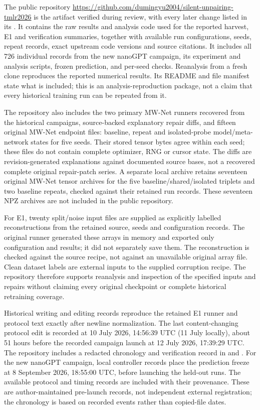 The public repository
\url{https://github.com/dumingyu2004/silent-unpairing-tmlr2026} is the artifact
verified during review, with every later change listed in its
. It contains the raw results and analysis code
used for the reported harvest, E1 and verification summaries, together with
available run configurations, seeds, repeat records, exact upstream code
versions and source citations. It includes all 726 individual records from
the new nanoGPT campaign, its experiment and analysis scripts, frozen
prediction, and per-seed checks. Reanalysis from a fresh clone
reproduces the reported numerical results. Its README and file manifest
state what is included; this is an analysis-reproduction package, not a
claim that every historical training run can be repeated from it.

The repository also includes the two primary MW-Net runners recovered from
the historical campaigns, source-backed explanatory repair diffs, and fifteen original
MW-Net endpoint files: baseline, repeat and isolated-probe model/meta-network
states for five seeds. Their stored tensor bytes agree within each seed;
these files do not contain complete optimizer, RNG or cursor state.
The diffs are revision-generated explanations against documented source
bases, not a recovered complete original repair-patch series.
A separate local archive retains seventeen original MW-Net tensor
archives for the five baseline/shared/isolated triplets and two baseline
repeats, checked against their retained run records. These seventeen NPZ
archives are not included in the public repository.

For E1, twenty split/noise input files are supplied as explicitly labelled
reconstructions from the retained source, seeds and configuration records.
The original runner generated these arrays in memory and exported only
configuration and results; it did not separately save them. The reconstruction
is checked against the source recipe, not against an unavailable original
array file. Clean dataset labels are external inputs to the supplied corruption
recipe. The repository therefore supports reanalysis and inspection of the
specified inputs and repairs without claiming every original checkpoint or
complete historical retraining coverage.

Historical writing and editing records reproduce the retained E1 runner and
protocol text exactly after newline normalization. The last content-changing
protocol edit is recorded at 10 July 2026, 14:56:39 UTC (11 July locally),
about 51 hours before the recorded campaign launch at 12 July 2026,
17:39:29 UTC. The repository includes a redacted chronology and verification
record in  and
.
For the new nanoGPT campaign, local controller records place the prediction
freeze at 8 September 2026, 18:55:00 UTC, before launching the held-out runs.
The available protocol and timing records are included with their provenance.
These are author-maintained pre-launch records, not independent external
registration; the chronology is based on recorded events rather than
copied-file dates.

